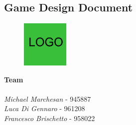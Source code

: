 \begin{titlepage}

\section*{Game Design Document}


\begin{figure}
	\centering
	\includegraphics[max width=0.2\textwidth]{../Pictures/DH_logo.png}
\end{figure}

\textbf{Team} \\ \\
\textit{Michael Marchesan} - 945887 \\
\textit{Luca Di Gennaro} - 961208 \\
\textit{Francesco Brischetto} - 958022 

\end{titlepage}

